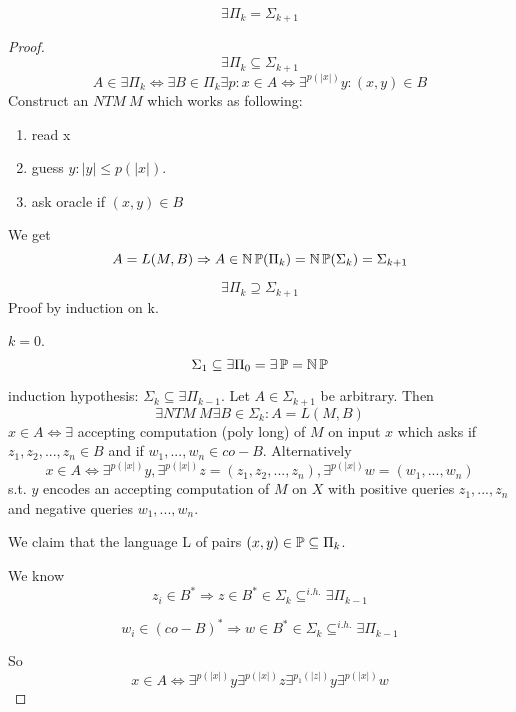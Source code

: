 \begin{theorem}
	\[ \exists \Pi_k = \Sigma_{k + 1} \]
\end{theorem}
\begin{proof}
	\[ \exists \Pi_k \subseteq \Sigma_{k + 1} \]
	\[ A \in \exists \Pi_k \iff \exists B \in \Pi_k \exists p: x \in A \iff \exists^{p(|x|)} y: (x,y) \in B \]
	Construct an $NTM\ M$ which works as following:
	\begin{enumerate}
		\item read x
		\item guess $y: |y| \leq p(|x|)$.
		\item ask oracle if $(x,y) \in B$
	\end{enumerate}

	We get
	\[ A = L(M, B) \Rightarrow A \in \operatorname{\operatorname{\mathbb{N}}\mathbb{P}}(\Pi_k) = \operatorname{\operatorname{\mathbb{N}}\mathbb{P}}(\Sigma_k) = \Sigma_{k + 1} \]

	\[ \exists \Pi_k \supseteq \Sigma_{k + 1} \]
	Proof by induction on k.

	$k = 0$.
	\[ \Sigma_1 \subseteq \exists \Pi_0 = \exists \operatorname{\mathbb{P}} = \operatorname{\operatorname{\mathbb{N}}\mathbb{P}} \]

	induction hypothesis: $\Sigma_k \subseteq \exists \Pi_{k - 1}$.
	Let $A \in \Sigma_{k + 1}$ be arbitrary.
	Then
	\[ \exists NTM\ M \exists B \in \Sigma_k: A = L(M, B) \]
	$x \in A \iff \exists$ accepting computation (poly long) of $M$ on input $x$ which asks if $z_1, z_2, ..., z_n \in B$ and if $w_1, ..., w_n \in co-B$.
	Alternatively
	\[ x \in A \iff \exists^{p(|x|)} y, \exists^{p(|x|)} z = (z_1, z_2, ..., z_n), \exists^{p(|x|)} w = (w_1, ..., w_n)\]
	s.t. $y$ encodes an accepting computation of $M$ on $X$ with positive queries $z_1, ..., z_n$ and negative queries $w_1, ..., w_n$.

	We claim that the language L of pairs $(x, y) \in \operatorname{\mathbb{P}} \subseteq \Pi_k$.

	We know
	\[ z_i \in B^{\ast} \Rightarrow z \in B^{\ast} \in \Sigma_k \subseteq^{i.h.} \exists \Pi_{k - 1}\]

	\[ w_i \in (co-B)^{\ast} \Rightarrow w \in B^{\ast} \in \Sigma_k \subseteq^{i.h.} \exists \Pi_{k - 1}\]

	So
	\[x \in A \iff \exists^{p(|x|)} y \exists^{p(|x|)} z \exists^{p_1(|z|)} y \exists^{p(|x|)} w\]
\end{proof}

